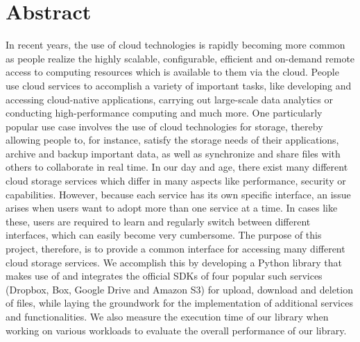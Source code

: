 \section*{Abstract}
In recent years, the use of cloud technologies is rapidly becoming more common as people realize the highly scalable, configurable, efficient and on-demand remote access to computing resources which is available to them via the cloud. People use cloud services to accomplish a variety of important tasks, like developing and accessing cloud-native applications, carrying out large-scale data analytics or conducting high-performance computing and much more. One particularly popular use case involves the use of cloud technologies for storage, thereby allowing people to, for instance, satisfy the storage needs of their applications, archive and backup important data, as well as synchronize and share files with others to collaborate in real time. In our day and age, there exist many different cloud storage services which differ in many aspects like performance, security or capabilities. However, because each service has its own specific interface, an issue arises when users want to adopt more than one service at a time. In cases like these, users are required to learn and regularly switch between different interfaces, which can easily become very cumbersome. The purpose of this project, therefore, is to provide a common interface for accessing many different cloud storage services. We accomplish this by developing a Python library that makes use of and integrates the official SDKs of four popular such services (Dropbox, Box, Google Drive and Amazon S3) for upload, download and deletion of files, while laying the groundwork for the implementation of additional services and functionalities. We also measure the execution time of our library when working on various workloads to evaluate the overall performance of our library.